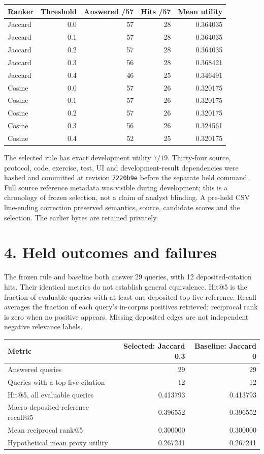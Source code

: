 \documentclass[10pt,letterpaper]{article}
\begin{document}
\begin{center}\small
\begin{tabular}{lrrrr}\toprule
Ranker & Threshold & Answered /57 & Hits /57 & Mean utility\\\midrule
Jaccard & 0.0 & 57 & 28 & 0.364035 \\
Jaccard & 0.1 & 57 & 28 & 0.364035 \\
Jaccard & 0.2 & 57 & 28 & 0.364035 \\
Jaccard & 0.3 & 56 & 28 & 0.368421 \\
Jaccard & 0.4 & 46 & 25 & 0.346491 \\
Cosine & 0.0 & 57 & 26 & 0.320175 \\
Cosine & 0.1 & 57 & 26 & 0.320175 \\
Cosine & 0.2 & 57 & 26 & 0.320175 \\
Cosine & 0.3 & 56 & 26 & 0.324561 \\
Cosine & 0.4 & 52 & 25 & 0.320175 \\
\bottomrule\end{tabular}
\end{center}

The selected rule has exact development utility $7/19$. Thirty-four source, protocol, code, exercise, test, UI and development-result dependencies were hashed and committed at revision \texttt{7220b9e} before the separate held command. Full source reference metadata was visible during development; this is a chronology of frozen selection, not a claim of analyst blinding. A pre-held CSV line-ending correction preserved semantics, source, candidate scores and the selection. The earlier bytes are retained privately.

\newpage
\section*{4. Held outcomes and failures}
The frozen rule and baseline both answer 29 queries, with 12 deposited-citation hits. Their identical metrics do not establish general equivalence. Hit@5 is the fraction of evaluable queries with at least one deposited top-five reference. Recall averages the fraction of each query's in-corpus positives retrieved; reciprocal rank is zero when no positive appears. Missing deposited edges are not independent negative relevance labels.

\begin{center}\small
\begin{tabular}{lrr}\toprule
Metric & Selected: Jaccard 0.3 & Baseline: Jaccard 0\\\midrule
Answered queries & 29 & 29 \\
Queries with a top-five citation & 12 & 12 \\
Hit@5, all evaluable queries & 0.413793 & 0.413793 \\
Macro deposited-reference recall@5 & 0.396552 & 0.396552 \\
Mean reciprocal rank@5 & 0.300000 & 0.300000 \\
Hypothetical mean proxy utility & 0.267241 & 0.267241 \\
\bottomrule\end{tabular}
\end{center}
\end{document}
